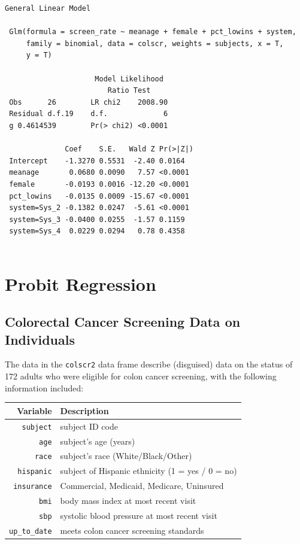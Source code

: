 \documentclass[]{book}
\theoremstyle{definition}
\theoremstyle{definition}
\theoremstyle{definition}
\theoremstyle{remark}
\begin{document}
\begin{verbatim}
General Linear Model
 
 Glm(formula = screen_rate ~ meanage + female + pct_lowins + system, 
     family = binomial, data = colscr, weights = subjects, x = T, 
     y = T)
 
                     Model Likelihood     
                        Ratio Test        
 Obs      26        LR chi2    2008.90    
 Residual d.f.19    d.f.             6    
 g 0.4614539        Pr(> chi2) <0.0001    
 
              Coef    S.E.   Wald Z Pr(>|Z|)
 Intercept    -1.3270 0.5531  -2.40 0.0164  
 meanage       0.0680 0.0090   7.57 <0.0001 
 female       -0.0193 0.0016 -12.20 <0.0001 
 pct_lowins   -0.0135 0.0009 -15.67 <0.0001 
 system=Sys_2 -0.1382 0.0247  -5.61 <0.0001 
 system=Sys_3 -0.0400 0.0255  -1.57 0.1159  
 system=Sys_4  0.0229 0.0294   0.78 0.4358  
 
\end{verbatim}

\section{Probit Regression}\label{probit-regression}

\subsection{Colorectal Cancer Screening Data on
Individuals}\label{colorectal-cancer-screening-data-on-individuals}

The data in the \texttt{colscr2} data frame describe (disguised) data on
the status of 172 adults who were eligible for colon cancer screening,
with the following information included:

\begin{longtable}[]{@{}rl@{}}
\toprule
Variable & Description\tabularnewline
\midrule
\endhead
\texttt{subject} & subject ID code\tabularnewline
\texttt{age} & subject's age (years)\tabularnewline
\texttt{race} & subject's race (White/Black/Other)\tabularnewline
\texttt{hispanic} & subject of Hispanic ethnicity (1 = yes / 0 =
no)\tabularnewline
\texttt{insurance} & Commercial, Medicaid, Medicare,
Uninsured\tabularnewline
\texttt{bmi} & body mass index at most recent visit\tabularnewline
\texttt{sbp} & systolic blood pressure at most recent
visit\tabularnewline
\texttt{up\_to\_date} & meets colon cancer screening
standards\tabularnewline
\bottomrule
\end{longtable}
\end{document}
